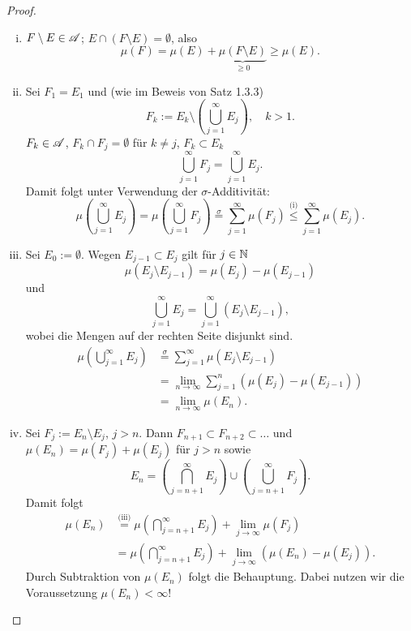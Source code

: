\begin{proof}
 \begin{enumerate}[(i)]
  \item $F \setminus E \in \mathscr{A}$; $E \cap (F \setminus E) = \emptyset$, also
   \[ \mu(F) = \mu(E) + \underbrace{\mu(F \setminus E)}_{\ge 0} \ge \mu(E). \]
  \item Sei $F_1 = E_1$ und (wie im Beweis von Satz 1.3.3)
   \[ F_k := E_k \setminus \left( \bigcup_{j=1}^\infty E_j \right), \quad k > 1. \]
   $F_k \in \mathscr{A}$, $F_k \cap F_j = \emptyset$ für $k \ne j$, $F_k \subset E_k$
   \[ \bigcup_{j=1}^\infty F_j = \bigcup_{j=1}^\infty E_j. \]
   Damit folgt unter Verwendung der $\sigma$-Additivität:
   \[ \mu \left( \bigcup_{j=1}^\infty E_j \right) = \mu \left( \bigcup_{j=1}^\infty F_j \right) \overset{\sigma}{=} \sum_{j=1}^\infty \mu( F_j ) \overset{\text{(i)}}{\le} \sum_{j=1}^\infty \mu( E_j ). \]
  \item Sei $E_0 := \emptyset$. Wegen $E_{j-1} \subset E_j$ gilt für $j \in \mathbb{N}$
   \[ \mu( E_j \setminus E_{j-1} ) = \mu(E_j) - \mu(E_{j-1}) \]
   und
   \[ \bigcup_{j=1}^\infty E_j = \bigcup_{j=1}^\infty(E_j \setminus E_{j-1}), \]
   wobei die Mengen auf der rechten Seite disjunkt sind.
   \begin{align*}
    \mu \left( \bigcup_{j=1}^\infty E_j \right) 
      &\overset{\sigma}{=} \sum_{j=1}^\infty \mu( E_j \setminus E_{j-1}) \\
      &= \lim_{n \to \infty} \sum_{j=1}^n ( \mu( E_j ) - \mu( E_{j-1} ) ) \\
      &= \lim_{n \to \infty} \mu( E_n ).
   \end{align*}
  \item Sei $F_j := E_n \setminus E_j$, $j > n$. Dann $F_{n+1} \subset F_{n+2} \subset \ldots$ und $\mu( E_n )  = \mu( F_j ) + \mu( E_j )$ für $j > n$ sowie
  \[ E_n = \left( \bigcap_{j=n+1}^\infty E_j \right) \cup \left( \bigcup_{j=n+1}^\infty F_j \right). \]
  Damit folgt
  \begin{align*}
   \mu(E_n) 
    &\overset{\text{(iii)}}{=} \mu \left( \bigcap_{j=n+1}^\infty E_j \right) + \lim_{j \to \infty} \mu (F_j) \\
    & = \mu \left( \bigcap_{j=n+1}^\infty E_j \right) + \lim_{j \to \infty} ( \mu( E_n ) - \mu(E_j) ).
  \end{align*}
  Durch Subtraktion von $\mu(E_n)$ folgt die Behauptung. Dabei nutzen wir die Voraussetzung $\mu(E_n) < \infty$! \qedhere
 \end{enumerate}
\end{proof}

